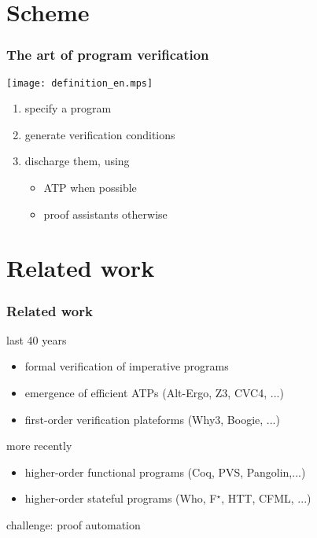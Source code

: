 \documentclass[xcolor=dvipsnames]{beamer}
\begin{document}
\section*{Scheme}
\begin{frame}
\frametitle{The art of program verification}
\texttt{[image: definition\_en.mps]}
\bigskip\pause
  \begin{enumerate}
  \item {\red specify} a program \pause
  \item {\red generate} verification conditions \pause
  \item {\red discharge} them, using
    \begin{itemize}
    \item ATP when possible
    \item proof assistants otherwise
    \end{itemize}
  \end{enumerate}
\end{frame}

\section*{Related work}
\begin{frame}
\frametitle{Related work}
{\red last 40 years}
	\begin{itemize}
		\item[] formal verification of imperative programs 
		\item[] emergence of efficient ATPs (Alt-Ergo, Z3, CVC4, ...)
		\item[] first-order verification plateforms (Why3, Boogie, ...)
	\end{itemize}\vspace*{1em} \pause
{\red more recently}
	\begin{itemize}
		\item[] higher-order functional programs (Coq, PVS, Pangolin,...)
		\item[] higher-order {\red stateful} programs (Who, F$^\star$, HTT, CFML, ...)
	\end{itemize}
\pause
\bigskip
{\red challenge}: proof automation
\end{frame}
\end{document}
